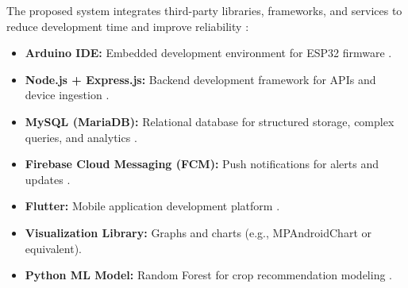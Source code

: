 The proposed system integrates third-party libraries, frameworks, 
and services to reduce development time and improve reliability 
\cite{sommerville2016software}:
\begin{itemize}[leftmargin=1.2cm]
    \item \textbf{Arduino IDE:} Embedded development 
    environment for ESP32 firmware \cite{raj2021survey}.
    \item \textbf{Node.js + Express.js:} Backend development 
    framework for APIs and device ingestion 
    \cite{thilakarathne2023fields}.
    \item \textbf{MySQL (MariaDB):} Relational database for 
    structured storage, complex queries, and analytics 
    \cite{uotila2020db}.
    \item \textbf{Firebase Cloud Messaging (FCM):} Push 
    notifications for alerts and updates \cite{khawas2018firebase}.
    \item \textbf{Flutter:} Mobile 
    application development platform \cite{mobileui2022}.
    \item \textbf{Visualization Library:} Graphs and charts (e.g., 
    MPAndroidChart or equivalent).
    \item \textbf{Python ML Model:} Random Forest 
    for crop recommendation modeling \cite{ali2025soilml}.
\end{itemize}

\setcounter{chapter}{3}